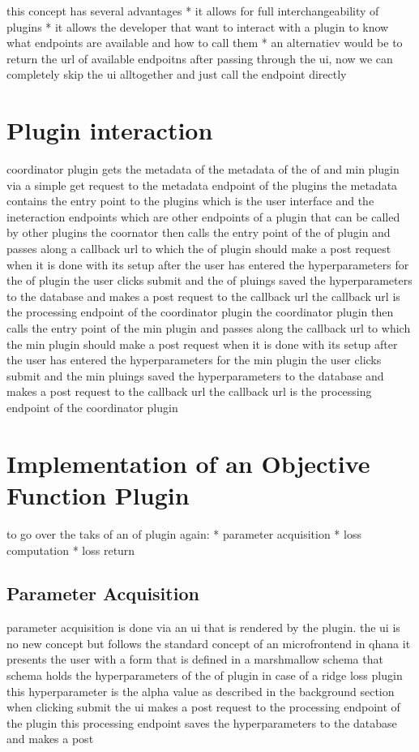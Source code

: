 \documentclass[
  a4paper,  %
  twoside,  %
  bibliography=totoc,
  headsepline,
  cleardoublepage=empty,
  parskip=half,
  draft=false
]{scrbook}
\begin{document}
this concept has several advantages
* it allows for full interchangeability of plugins
* it allows the developer that want to interact with a plugin to know what endpoints are available and how to call them
* an alternatiev would be to return the url of available endpoitns after passing through the ui, now we can completely skip the ui alltogether and just call the endpoint directly


\section{Plugin interaction}
\label{sec:pluginInteraction}

coordinator plugin gets the metadata of the metadata of the of and min plugin via a simple get request to the metadata endpoint of the plugins
the metadata contains the entry point to the plugins which is the user interface and the ineteraction endpoints which are other endpoints of a plugin that can be called by other plugins
the coornator then calls the entry point of the of plugin and passes along a callback url to which the of plugin should make a post request when it is done with its setup
after the user has entered the hyperparameters for the of plugin the user clicks submit and the of pluings saved the hyperparameters to the database and makes a post request to the callback url
the callback url is the processing endpoint of the coordinator plugin
the coordinator plugin then calls the entry point of the min plugin and passes along the callback url to which the min plugin should make a post request when it is done with its setup
after the user has entered the hyperparameters for the min plugin the user clicks submit and the min pluings saved the hyperparameters to the database and makes a post request to the callback url
the callback url is the processing endpoint of the coordinator plugin


\section{Implementation of an Objective Function Plugin}
\label{sec:implementationOfAnObjectiveFunctionPlugin}

to go over the taks of an of plugin again:
* parameter acquisition
* loss computation
* loss return

\subsection{Parameter Acquisition}
\label{subsec:parameterAcquisition}
parameter acquisition is done via an ui that is rendered by the plugin.
the ui is no new concept but follows the standard concept of an microfrontend in qhana
it presents the user with a form that is defined in a marshmallow schema
that schema holds the hyperparameters of the of plugin
in case of a ridge loss plugin this hyperparameter is the alpha value as described in the background section
when clicking submit the ui makes a post request to the processing endpoint of the plugin
this processing endpoint saves the hyperparameters to the database and makes a post
\end{document}
